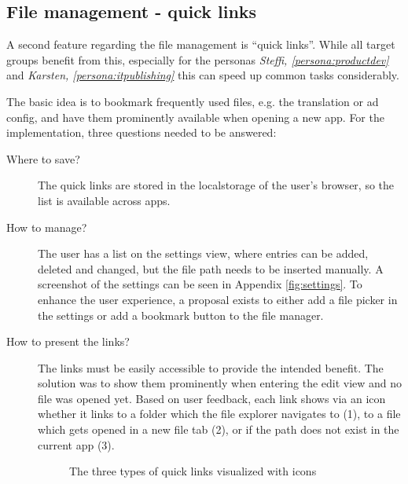 \subsection{File management - quick links}

A second feature regarding the file management is ``quick links''. While all target groups benefit from this, especially for the personas \textit{Steffi, \ref{persona:productdev}} and \textit{Karsten, \ref{persona:itpublishing}}
this can speed up common tasks considerably.

The basic idea is to bookmark frequently used files, e.g. the translation or ad config, and have them prominently available when opening a new app.
For the implementation, three questions needed to be answered:
\begin{description}
  \item[Where to save?] The quick links are stored in the \Gls{localstorage} of the user's browser, so the list is available across apps.
  \item[How to manage?] The user has a list on the settings view, where entries can be added, deleted and changed, but the file path needs to be inserted manually. A screenshot of the settings can be seen in Appendix \ref{fig:settings}. To enhance the user experience, a proposal exists to either add a file picker in the settings or add a bookmark button to the file manager.
  \item[How to present the links?] The links must be easily accessible to provide the intended benefit. The solution was to show them prominently when entering the edit view and no file was opened yet. Based on user feedback, each link shows via an icon whether it links to a folder which the file explorer navigates to (1), to a file which gets opened in a new file tab (2), or if the path does not exist in the current app (3).
  \begin{figure}[h!]
    \centering
    \caption{The three types of quick links visualized with icons}
  \end{figure}
\end{description}
